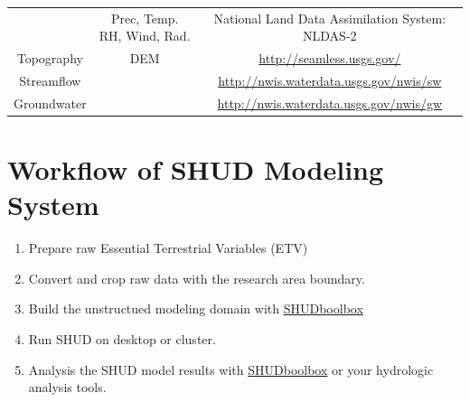 \documentclass[
]{scrbook}
\providecommand{\tightlist}{%
  \setlength{\itemsep}{0pt}\setlength{\parskip}{0pt}}
\begin{document}
\begin{longtable}[]{@{}ccc@{}}
\begin{minipage}[t]{0.14\columnwidth}
\end{minipage} & \begin{minipage}[t]{0.24\columnwidth}\centering
Prec, Temp. RH, Wind, Rad.\strut
\end{minipage} & \begin{minipage}[t]{0.54\columnwidth}\centering
National Land Data Assimilation System: NLDAS-2\strut
\end{minipage}\tabularnewline
\begin{minipage}[t]{0.14\columnwidth}\centering
Topography\strut
\end{minipage} & \begin{minipage}[t]{0.24\columnwidth}\centering
DEM\strut
\end{minipage} & \begin{minipage}[t]{0.54\columnwidth}\centering
\url{http://seamless.usgs.gov/}\strut
\end{minipage}\tabularnewline
\begin{minipage}[t]{0.14\columnwidth}\centering
Streamflow\strut
\end{minipage} & \begin{minipage}[t]{0.24\columnwidth}\centering
\strut
\end{minipage} & \begin{minipage}[t]{0.54\columnwidth}\centering
\url{http://nwis.waterdata.usgs.gov/nwis/sw}\strut
\end{minipage}\tabularnewline
\begin{minipage}[t]{0.14\columnwidth}\centering
Groundwater\strut
\end{minipage} & \begin{minipage}[t]{0.24\columnwidth}\centering
\strut
\end{minipage} & \begin{minipage}[t]{0.54\columnwidth}\centering
\url{http://nwis.waterdata.usgs.gov/nwis/gw}\strut
\end{minipage}\tabularnewline
\bottomrule
\end{longtable}

\hypertarget{workflow-of-shud-modeling-system}{%
\section{Workflow of SHUD Modeling System}\label{workflow-of-shud-modeling-system}}

\begin{enumerate}
\def\labelenumi{\arabic{enumi}.}
\tightlist
\item
  Prepare raw Essential Terrestrial Variables (ETV)
\item
  Convert and crop raw data with the research area boundary.
\item
  Build the unstructued modeling domain with \href{https://github.com/SHUD-System/SHUD}{SHUDboolbox}
\item
  Run SHUD on desktop or cluster.
\item
  Analysis the SHUD model results with \href{https://github.com/SHUD-System/SHUDboolbox}{SHUDboolbox} or your hydrologic analysis tools.
\end{enumerate}
\end{document}
